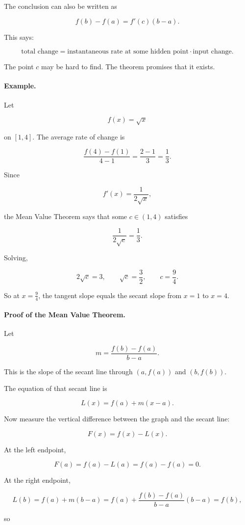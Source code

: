 The conclusion can also be written as

\[
f(b)-f(a)=f'(c)(b-a).
\]

This says:

\[
\text{total change}
=
\text{instantaneous rate at some hidden point}
\cdot
\text{input change}.
\]

The point \(c\) may be hard to find.  The theorem promises that it exists.

\paragraph{Example.}
Let

\[
f(x)=\sqrt{x}
\]

on \([1,4]\).  The average rate of change is

\[
\frac{f(4)-f(1)}{4-1}
=
\frac{2-1}{3}
=
\frac13.
\]

Since

\[
f'(x)=\frac1{2\sqrt{x}},
\]

the Mean Value Theorem says that some \(c\in(1,4)\) satisfies

\[
\frac1{2\sqrt{c}}=\frac13.
\]

Solving,

\[
2\sqrt{c}=3,
\qquad
\sqrt{c}=\frac32,
\qquad
c=\frac94.
\]

So at \(x=\frac94\), the tangent slope equals the secant slope from \(x=1\) to
\(x=4\).

\paragraph{Proof of the Mean Value Theorem.}
Let

\[
m=\frac{f(b)-f(a)}{b-a}.
\]

This is the slope of the secant line through \((a,f(a))\) and \((b,f(b))\).

The equation of that secant line is

\[
L(x)=f(a)+m(x-a).
\]

Now measure the vertical difference between the graph and the secant line:

\[
F(x)=f(x)-L(x).
\]

At the left endpoint,

\[
F(a)=f(a)-L(a)=f(a)-f(a)=0.
\]

At the right endpoint,

\[
L(b)=f(a)+m(b-a)
=
f(a)+\frac{f(b)-f(a)}{b-a}(b-a)
=
f(b),
\]

so

